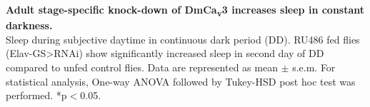 \label{fig:S}
\textbf{Adult stage-specific knock-down of DmCa\textsubscript{v}3 increases sleep in constant darkness.}
\\
Sleep during subjective daytime in continuous dark period (DD). 
RU486 fed flies (Elav-GS\textgreater{}RNAi) show significantly increased sleep in second day of DD compared to unfed control flies.
Data are represented as mean $\pm$ s.e.m.
For statistical analysis, One-way ANOVA followed by Tukey-HSD post hoc test was performed.
*p$<$0.05.
  


  
  
  
  
  